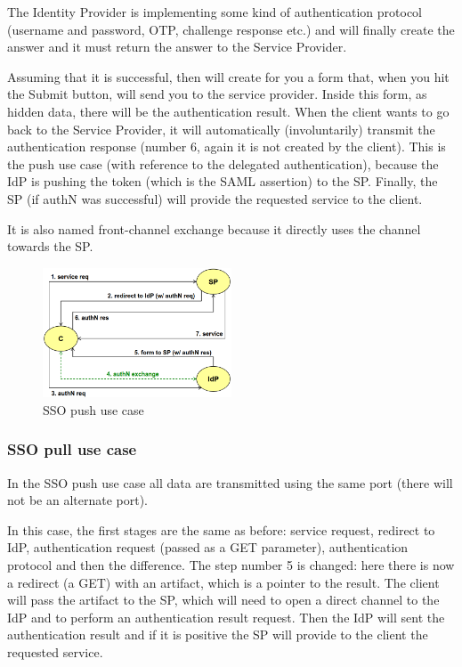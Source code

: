 The Identity Provider is implementing some kind of authentication
protocol (username and password, OTP, challenge response etc.) and
will finally create the answer and it must return the answer to the
Service Provider.


Assuming that it is successful, then will create for you a form that,
when you hit the Submit button, will send you to the service provider.
Inside this form, as hidden data, there will be the authentication
result. When the client wants to go back to the Service Provider, it
will automatically (involuntarily) transmit the authentication
response (number 6, again it is not created by the client). This is
the push use case (with reference to the delegated authentication),
because the IdP is pushing the token (which is the SAML assertion) to
the SP. Finally, the SP (if authN was successful) will provide the
requested service to the client.

It is also named front-channel exchange because it directly uses the
channel towards the SP.

\begin{figure}[H]
  \centering
  \includegraphics[width=0.5\textwidth]{img/sso push use case.png}
  \caption{SSO push use case}
  \label{fig:sso-push-use-case}
\end{figure}

\subsubsection{SSO pull use case}
In the SSO push use case all data are transmitted using the same port
(there will not be an alternate port).

In this case, the first stages are the same as before: service
request, redirect to IdP, authentication request (passed as a GET
parameter), authentication protocol and then the difference. The step
number 5 is changed: here there is now a redirect (a GET) with an
artifact, which is a pointer to the result. The client will pass the
artifact to the SP, which will need to open a direct channel to the
IdP and to perform an authentication result request. Then the IdP will
sent the authentication result and if it is positive the SP will
provide to the client the requested service.

